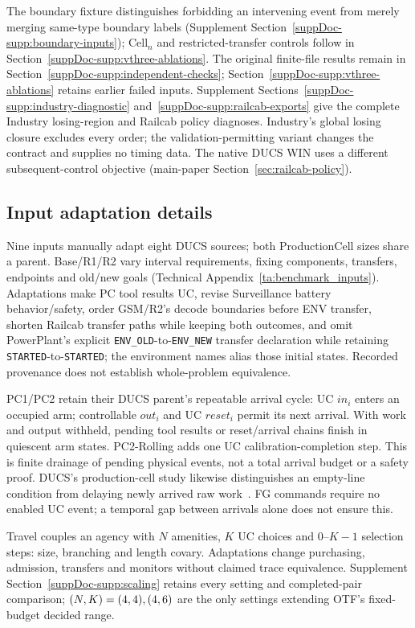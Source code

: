 The boundary fixture distinguishes forbidding an intervening event from merely merging same-type boundary labels (Supplement Section~\ref{suppDoc-supp:boundary-inputs}); Cell$_n$ and restricted-transfer controls follow in Section~\ref{suppDoc-supp:vthree-ablations}. The original finite-file results remain in Section~\ref{suppDoc-supp:independent-checks}; Section~\ref{suppDoc-supp:vthree-ablations} retains earlier failed inputs. Supplement Sections~\ref{suppDoc-supp:industry-diagnostic} and~\ref{suppDoc-supp:railcab-exports} give the complete Industry losing-region and Railcab policy diagnoses. Industry's global losing closure excludes every order; the validation-permitting variant changes the contract and supplies no timing data. The native DUCS WIN uses a different subsequent-control objective (main-paper Section~\ref{sec:railcab-policy}).

\subsection{Input adaptation details}
Nine inputs manually adapt eight DUCS sources; both ProductionCell sizes share a parent. Base/R1/R2 vary interval requirements, fixing components, transfers, endpoints and old/new goals (Technical Appendix~\ref{ta:benchmark_inputs}). Adaptations make PC tool results UC, revise Surveillance battery behavior/safety, order GSM/R2's decode boundaries before ENV transfer, shorten Railcab transfer paths while keeping both outcomes, and omit PowerPlant's explicit \texttt{ENV\_OLD}-to-\texttt{ENV\_NEW} transfer declaration while retaining \texttt{STARTED}-to-\texttt{STARTED}; the environment names alias those initial states. Recorded provenance does not establish whole-problem equivalence.

PC1/PC2 retain their DUCS parent's repeatable arrival cycle: UC $in_i$ enters an occupied arm; controllable $out_i$ and UC $reset_i$ permit its next arrival. With work and output withheld, pending tool results or reset/arrival chains finish in quiescent arm states. PC2-Rolling adds one UC calibration-completion step. This is finite drainage of pending physical events, not a total arrival budget or a safety proof. DUCS's production-cell study likewise distinguishes an empty-line condition from delaying newly arrived raw work~\cite[Sec.~6.1]{Nahabedian2020}. FG commands require no enabled UC event; a temporal gap between arrivals alone does not ensure this.

Travel couples an agency with $N$ amenities, $K$ UC choices and $0$--$K-1$ selection steps: size, branching and length covary. Adaptations change purchasing, admission, transfers and monitors without claimed trace equivalence. Supplement Section~\ref{suppDoc-supp:scaling} retains every setting and completed-pair comparison; $(N,K)=(4,4),(4,6){}$ are the only settings extending OTF's fixed-budget decided range.

